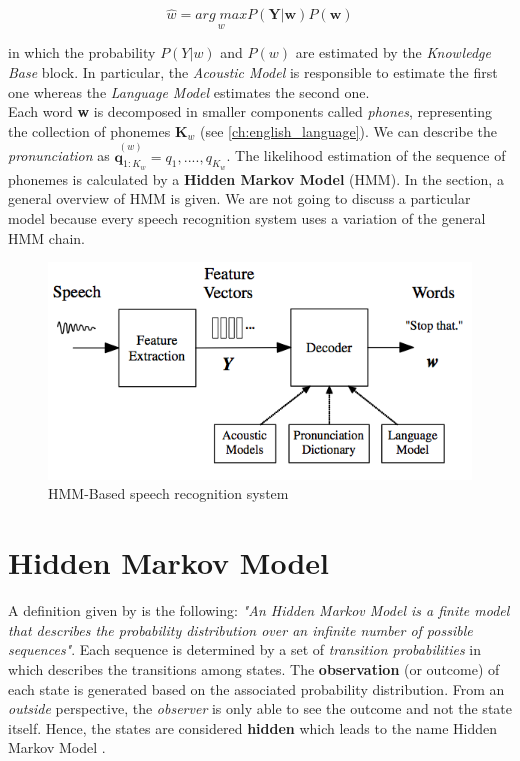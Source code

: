 \begin{equation}
	\widehat{w} = \underset{w}{arg \; max} P (\textbf{Y}|\textbf{w}) P(\textbf{w})
\end{equation}

\noindent in which the probability $P(Y|w)$ and $P(w)$ are estimated by the \textit{Knowledge Base} block. In particular, the \textit{Acoustic Model} is responsible to estimate the first one whereas the \textit{Language Model} estimates the second one. \\
\noindent Each word \textbf{w} is decomposed in smaller components called \textit{phones}, representing the collection of phonemes $\textbf{K}_{w}$ (see \ref{ch:english_language}). We can describe the \textit{pronunciation} as $\overset{(w)}{\textbf{q}_{1:K_{w}}} = q_{1}, ...., q_{K_{w}}$. The likelihood estimation of the sequence of phonemes is calculated by a \textbf{Hidden Markov Model} (HMM). In the section, a general overview of HMM is given. We are not going to discuss a particular model because every speech recognition system uses a variation of the general HMM chain. \\

\begin{figure}[!ht]
	\centering
	\includegraphics[scale=0.8]{Figures/speech_Architecture.png}
	\caption{HMM-Based speech recognition system \cite{gales2008application}}
	\label{fig:speech_architecture}
\end{figure}

\section{Hidden Markov Model}
\label{sec:hmm}
\noindent A definition given by \cite{eddy1996hidden} is the following: \textit{"An Hidden Markov Model is a finite model that describes the probability distribution over an infinite number of possible sequences"}. Each sequence is determined by a set of \textit{transition probabilities} in which describes the transitions among states. The \textbf{observation} (or outcome) of each state is generated based on the associated probability distribution. From an \textit{outside} perspective, the \textit{observer} is only able to see the outcome and not the state itself. Hence, the states are considered \textbf{hidden} which leads to the name Hidden Markov Model \cite{def_hmm}. \\

